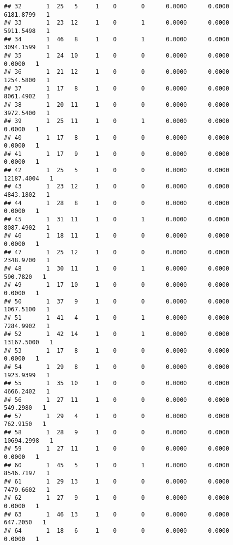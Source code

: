 \documentclass[
]{article}
\begin{document}
\begin{enumerate}
\begin{verbatim}
## 32       1  25   5     1    0       0      0.0000      0.0000   6181.8799   1
## 33       1  23  12     1    0       1      0.0000      0.0000   5911.5498   1
## 34       1  46   8     1    0       1      0.0000      0.0000   3094.1599   1
## 35       1  24  10     1    0       0      0.0000      0.0000      0.0000   1
## 36       1  21  12     1    0       0      0.0000      0.0000   1254.5800   1
## 37       1  17   8     1    0       0      0.0000      0.0000   8061.4902   1
## 38       1  20  11     1    0       0      0.0000      0.0000   3972.5400   1
## 39       1  25  11     1    0       1      0.0000      0.0000      0.0000   1
## 40       1  17   8     1    0       0      0.0000      0.0000      0.0000   1
## 41       1  17   9     1    0       0      0.0000      0.0000      0.0000   1
## 42       1  25   5     1    0       0      0.0000      0.0000  12187.4004   1
## 43       1  23  12     1    0       0      0.0000      0.0000   4843.1802   1
## 44       1  28   8     1    0       0      0.0000      0.0000      0.0000   1
## 45       1  31  11     1    0       1      0.0000      0.0000   8087.4902   1
## 46       1  18  11     1    0       0      0.0000      0.0000      0.0000   1
## 47       1  25  12     1    0       0      0.0000      0.0000   2348.9700   1
## 48       1  30  11     1    0       1      0.0000      0.0000    590.7820   1
## 49       1  17  10     1    0       0      0.0000      0.0000      0.0000   1
## 50       1  37   9     1    0       0      0.0000      0.0000   1067.5100   1
## 51       1  41   4     1    0       1      0.0000      0.0000   7284.9902   1
## 52       1  42  14     1    0       1      0.0000      0.0000  13167.5000   1
## 53       1  17   8     1    0       0      0.0000      0.0000      0.0000   1
## 54       1  29   8     1    0       0      0.0000      0.0000   1923.9399   1
## 55       1  35  10     1    0       0      0.0000      0.0000   4666.2402   1
## 56       1  27  11     1    0       0      0.0000      0.0000    549.2980   1
## 57       1  29   4     1    0       0      0.0000      0.0000    762.9150   1
## 58       1  28   9     1    0       0      0.0000      0.0000  10694.2998   1
## 59       1  27  11     1    0       0      0.0000      0.0000      0.0000   1
## 60       1  45   5     1    0       1      0.0000      0.0000   8546.7197   1
## 61       1  29  13     1    0       0      0.0000      0.0000   7479.6602   1
## 62       1  27   9     1    0       0      0.0000      0.0000      0.0000   1
## 63       1  46  13     1    0       0      0.0000      0.0000    647.2050   1
## 64       1  18   6     1    0       0      0.0000      0.0000      0.0000   1

\end{verbatim}
\end{enumerate}
\end{document}
